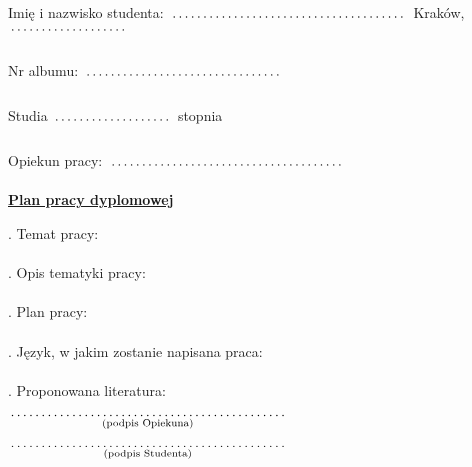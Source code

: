 \documentclass[a4paper,8pt]{article}
\newcommand{\fillField}[2]{
    $\underset{\text{#1}}{\parbox[t]{#2}{\dotfill}}$
}
\begin{document}
\noindent
Imię i nazwisko studenta: \fillField{}{6cm} \hfill Kraków, \fillField{}{3cm}\\\\
Nr albumu:\fillField{}{5cm} \\\\
Studia \fillField{}{3cm} stopnia\\\\
Opiekun pracy: \fillField{}{6cm}\\


\vskip 2.0cm

\begin{center}
{\Large \underline{\textbf{Plan pracy dyplomowej}}}
\end{center}

\vskip 0.5cm

. Temat pracy: \\

\noindent
\null  \\

. Opis tematyki pracy: \\

\noindent
\null  \\

. Plan pracy: \\

\noindent
\null  \\

. Język, w jakim zostanie napisana praca: \\

\noindent
\null  \\

. Proponowana literatura:  \\

\vskip 2.0cm

\null\hfill\fillField{(podpis Opiekuna)}{7cm}%

\vskip 2.0cm

\null\hfill\fillField{(podpis Studenta)}{7cm}%

\vskip 4.0cm
\end{document}
